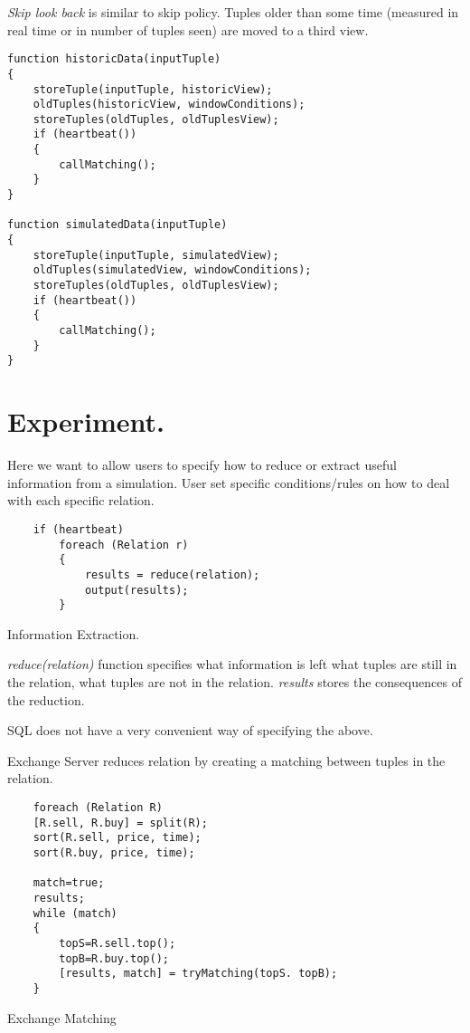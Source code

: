 \documentclass{article}
\begin{document}
\noindent \emph{Skip look back} is similar to skip policy. Tuples older than some time (measured in real time or in number of tuples seen) are moved to a third view.
\begin{verbatim}   
function historicData(inputTuple)
{
    storeTuple(inputTuple, historicView);
    oldTuples(historicView, windowConditions);
    storeTuples(oldTuples, oldTuplesView);
    if (heartbeat())
    {
        callMatching();
    }
}

function simulatedData(inputTuple)
{
    storeTuple(inputTuple, simulatedView);
    oldTuples(simulatedView, windowConditions);
    storeTuples(oldTuples, oldTuplesView);
    if (heartbeat())
    {
        callMatching();
    }
}
\end{verbatim}

\section{Experiment.}

Here we want to allow users to specify how to reduce or extract useful information from a simulation. User set specific conditions/rules on how to deal with each specific relation. 

\begin{program}
    \begin{verbatim}  
    if (heartbeat) 
        foreach (Relation r)
        {
            results = reduce(relation);
            output(results);
        }
    \end{verbatim}
\caption{Information Extraction.}
\end{program}

\emph{reduce(relation)} function specifies what information is left what tuples are still in the relation, what tuples are not in the relation. \emph{results} stores the consequences of the reduction. 

SQL does not have a very convenient way of specifying the above.

Exchange Server reduces relation by creating a matching between tuples in the relation.

\begin{program}
    \begin{verbatim}  
    foreach (Relation R)
    [R.sell, R.buy] = split(R);
    sort(R.sell, price, time);
    sort(R.buy, price, time);
    
    match=true;
    results;
    while (match)
    {
        topS=R.sell.top();
        topB=R.buy.top();
        [results, match] = tryMatching(topS. topB);
    }
    \end{verbatim}
\caption{Exchange Matching}
\end{program}
\end{document}
